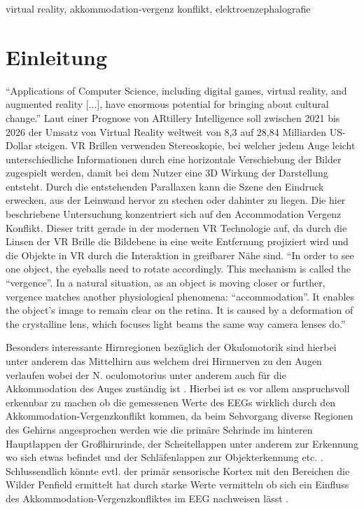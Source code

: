 \documentclass[conference]{IEEEtran}
\begin{document}
\begin{IEEEkeywords}
virtual reality, akkommodation-vergenz konflikt, elektroenzephalografie
\end{IEEEkeywords}

\section{Einleitung}
“Applications of Computer Science, including digital games, virtual reality, and augmented reality [...], have enormous potential for bringing about cultural change.” \cite{b3} Laut einer Prognose von ARtillery Intelligence soll zwischen 2021 bis 2026 der Umsatz von Virtual Reality weltweit von 8,3 auf 28,84 Milliarden US-Dollar steigen. \cite{b2} 
VR Brillen verwenden Stereoskopie, bei welcher jedem Auge leicht unterschiedliche Informationen durch eine horizontale Verschiebung der Bilder zugespielt werden, damit bei dem Nutzer eine 3D Wirkung der Darstellung entsteht. Durch die entstehenden Parallaxen kann die Szene den Eindruck erwecken, aus der Leinwand hervor zu stechen oder dahinter zu liegen.\cite{b4}
Die hier beschriebene Untersuchung konzentriert sich auf den Accommodation Vergenz Konflikt. Dieser tritt gerade in der modernen VR Technologie auf, da durch die Linsen der VR Brille die Bildebene in eine weite Entfernung projiziert wird und die Objekte in VR durch die Interaktion in greifbarer Nähe sind.
“In order to see one object, the eyeballs need to rotate accordingly. This mechanism is called the “vergence”. In a natural situation, as an object is moving closer or further, vergence matches another physiological phenomena: “accommodation”. It enables the object’s image to remain clear on the retina. It is caused by a deformation of the crystalline lens, which focuses light beams the same way camera lenses do.”\cite{b1}

Besonders interessante Hirnregionen bezüglich der Okulomotorik sind hierbei unter anderem das  Mittelhirn aus welchem drei Hirnnerven zu den Augen verlaufen wobei der N. oculomotorius unter anderem auch für die Akkommodation des Auges zuständig ist \cite{b6}. Hierbei ist es vor allem anspruchsvoll erkennbar zu machen ob die gemessenen Werte des EEGs wirklich durch den Akkommodation-Vergenzkonflikt kommen, da beim Sehvorgang diverse Regionen des Gehirns angesprochen werden wie die primäre Sehrinde im hinteren Hauptlappen der Großhirnrinde, der Scheitellappen unter anderem zur Erkennung wo sich etwas befindet und der Schläfenlappen zur Objekterkennung etc. \cite{b8}. Schlussendlich könnte evtl. der primär sensorische Kortex mit den Bereichen die Wilder Penfield ermittelt hat durch starke Werte vermitteln ob sich ein Einfluss des Akkommodation-Vergenzkonfliktes im EEG nachweisen lässt \cite{b7}.
\end{document}
